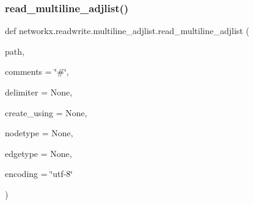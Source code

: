 \subsubsection{\texorpdfstring{read\+\_\+multiline\+\_\+adjlist()}{read\_multiline\_adjlist()}}
{\footnotesize\ttfamily def networkx.\+readwrite.\+multiline\+\_\+adjlist.\+read\+\_\+multiline\+\_\+adjlist (\begin{DoxyParamCaption}\item[{}]{path,  }\item[{}]{comments = {\ttfamily \char`\"{}\#\char`\"{}},  }\item[{}]{delimiter = {\ttfamily None},  }\item[{}]{create\+\_\+using = {\ttfamily None},  }\item[{}]{nodetype = {\ttfamily None},  }\item[{}]{edgetype = {\ttfamily None},  }\item[{}]{encoding = {\ttfamily \char`\"{}utf-\/8\char`\"{}} }\end{DoxyParamCaption})}

